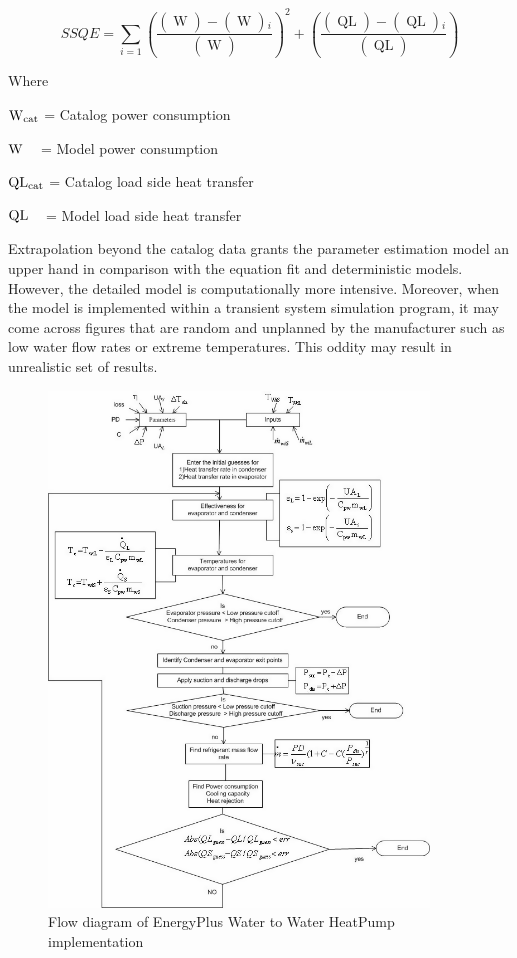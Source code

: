 \begin{equation}
SSQE = \sum\limits_{i = 1} {{{\left( {\frac{{\left( {\mathop {W{}_{cat}}\limits^{} } \right) - \left( {\mathop W\limits^{} } \right){}_i}}{{\left( {\mathop {W{}_{cat}}\limits^{} } \right)}}} \right)}^2}}  + \left( {\frac{{\left( {\mathop {QL{}_{cat}}\limits^{} } \right) - \left( {\mathop {QL}\limits^{} } \right){}_i}}{{\left( {\mathop {QL{}_{cat}}\limits^{} } \right)}}} \right)
\end{equation}

Where

\({\rm{W}}{}_{{\rm{cat}}}\) = Catalog power consumption

\({\rm{W}}{}_{}\) ~ = Model power consumption

\({\rm{QL}}{}_{{\rm{cat}}}\) = Catalog load side heat transfer

\({\rm{QL}}{}_{}\) ~ = Model load side heat transfer

Extrapolation beyond the catalog data grants the parameter estimation model an upper hand in comparison with the equation fit and deterministic models. However, the detailed model is computationally more intensive. Moreover, when the model is implemented within a transient system simulation program, it may come across figures that are random and unplanned by the manufacturer such as low water flow rates or extreme temperatures. This oddity may result in unrealistic set of results.

\begin{figure}[hbtp] %
\centering
\includegraphics[width=0.9\textwidth, height=0.9\textheight, keepaspectratio=true]{media/image5314.png}
\caption{Flow diagram of EnergyPlus Water to Water HeatPump implementation \protect \label{fig:flow-diagram-of-energyplus-water-to-water}}
\end{figure}

